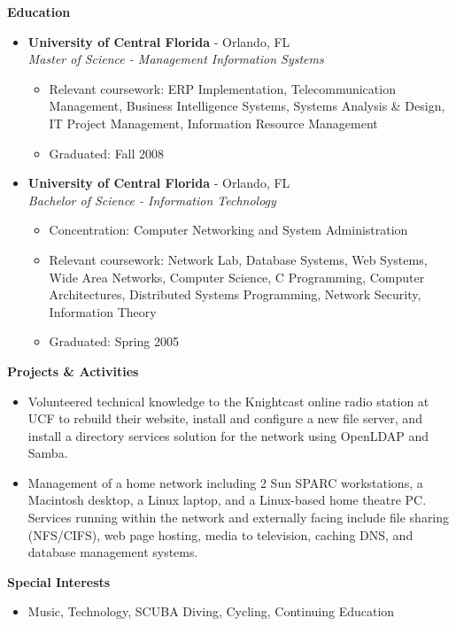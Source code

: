 \documentclass[10pt,oneside]{article}
\newenvironment{ressection}[1]{
	\vspace{4pt}
	\textbf{\selectfont\normalsize#1}
	\begin{itemize}
	\vspace{3pt}
}{
	\end{itemize}
}
\newcommand{\resitem}[1]{
	\vspace{-4pt}
	\item \begin{flushleft} #1 \end{flushleft}
}
\newcommand{\ressubitem}[1]{
	\vspace{-1pt}
	\item \begin{flushleft} #1 \end{flushleft}
}
\newcommand{\resbigitem}[3]{
	\vspace{-5pt}
	\item
	\textbf{#1} - #2 \\
	\textit{#3}
}
\newenvironment{ressubsec}[3]{
	\resbigitem{#1}{#2}{#3}
	\vspace{-2pt}
	\begin{itemize}
}{
	\end{itemize}
}
\begin{document}
\begin{ressection}{Education}

	\begin{ressubsec}{University of Central Florida}{Orlando, FL}{Master of Science - Management Information Systems}
		\ressubitem{Relevant coursework: ERP Implementation, Telecommunication Management, Business Intelligence Systems, Systems Analysis \& Design, IT Project Management, Information Resource Management}
		\ressubitem{Graduated: Fall 2008}
	\end{ressubsec}

	\begin{ressubsec}{University of Central Florida}{Orlando, FL}{Bachelor of Science - Information Technology}
		\ressubitem{Concentration: Computer Networking and System Administration}
		\ressubitem{Relevant coursework: Network Lab, Database Systems, Web Systems, Wide Area Networks, Computer Science, C Programming, Computer Architectures, Distributed Systems Programming, Network Security, Information Theory}
		\ressubitem{Graduated: Spring 2005}
	\end{ressubsec}

\end{ressection}


\begin{ressection}{Projects \& Activities}

	\resitem{Volunteered technical knowledge to the Knightcast online radio station at UCF to rebuild their website, install and configure a new file server, and install a directory services solution for the network using OpenLDAP and Samba.}
	
	\resitem{Management of a home network including 2 Sun SPARC workstations, a Macintosh desktop, a Linux laptop, and a Linux-based home theatre PC.  Services running within the network and externally facing include file sharing (NFS/CIFS), web page hosting, media to television, caching DNS, and database management systems.}

\end{ressection}


\begin{ressection}{Special Interests}

	\resitem{Music, Technology, SCUBA Diving, Cycling, Continuing Education}

\end{ressection}

\end{document}
